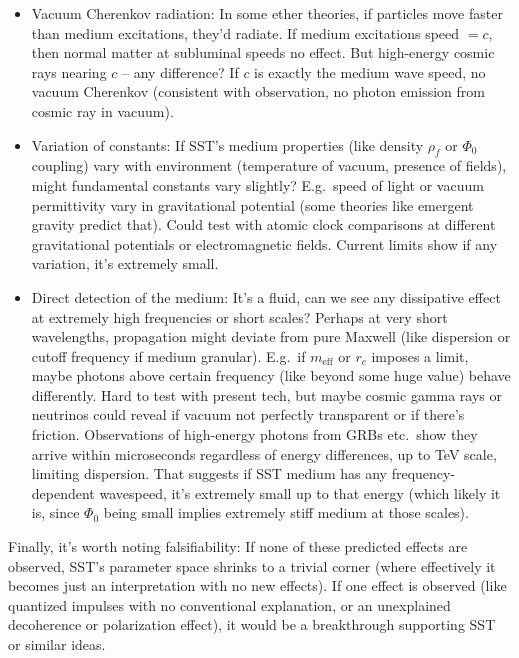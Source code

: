 \documentclass[10pt,reprint,aps,onecolumn,nofootinbib]{revtex4-2}
\newcommand{\rc}{r_c}                                    %
\providecommand{\rc}{r_c}
\newcommand{\rhoF}{\rho_{\!f}}     %
\begin{document}
\begin{itemize}
  \item Vacuum Cherenkov radiation: In some ether theories, if particles move faster than medium excitations, they'd radiate. If medium excitations speed $=c$, then normal matter at subluminal speeds no effect. But high-energy cosmic rays nearing $c$ -- any difference? If $c$ is exactly the medium wave speed, no vacuum Cherenkov (consistent with observation, no photon emission from cosmic ray in vacuum).

  \item Variation of constants: If SST's medium properties (like density $\rhoF$ or $\Phi_0$ coupling) vary with environment (temperature of vacuum, presence of fields), might fundamental constants vary slightly? E.g.\ speed of light or vacuum permittivity vary in gravitational potential (some theories like emergent gravity predict that). Could test with atomic clock comparisons at different gravitational potentials or electromagnetic fields. Current limits show if any variation, it's extremely small.

  \item Direct detection of the medium: It's a fluid, can we see any dissipative effect at extremely high frequencies or short scales? Perhaps at very short wavelengths, propagation might deviate from pure Maxwell (like dispersion or cutoff frequency if medium granular). E.g.\ if $m_{\text{eff}}$ or $\rc$ imposes a limit, maybe photons above certain frequency (like beyond some huge value) behave differently. Hard to test with present tech, but maybe cosmic gamma rays or neutrinos could reveal if vacuum not perfectly transparent or if there's friction. Observations of high-energy photons from GRBs etc.\ show they arrive within microseconds regardless of energy differences, up to TeV scale, limiting dispersion. That suggests if SST medium has any frequency-dependent wavespeed, it's extremely small up to that energy (which likely it is, since $\Phi_0$ being small implies extremely stiff medium at those scales).
\end{itemize}

Finally, it's worth noting falsifiability: If none of these predicted effects are observed, SST's parameter space shrinks to a trivial corner (where effectively it becomes just an interpretation with no new effects). If one effect is observed (like quantized impulses with no conventional explanation, or an unexplained decoherence or polarization effect), it would be a breakthrough supporting SST or similar ideas.
\end{document}
